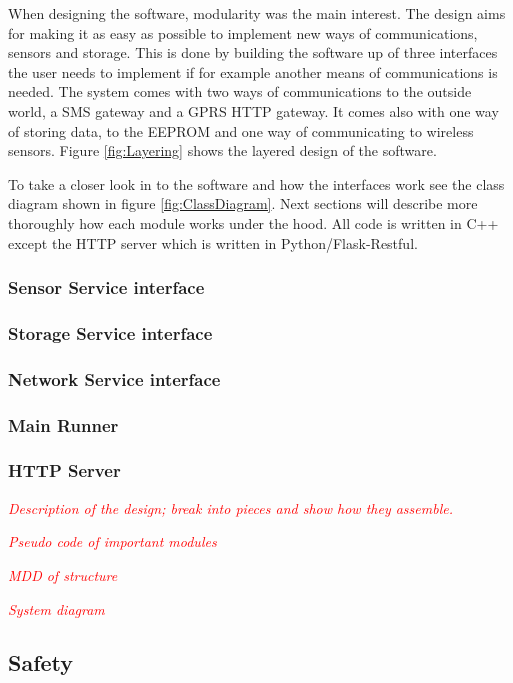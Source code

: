 When designing the software, modularity was the main interest. The design aims for making
it as easy as possible to implement new ways of communications, sensors and storage. This 
is done by building the software up of three interfaces the user needs to implement if for
example another means of communications is needed. The system comes with two ways of
communications to the outside world, a SMS gateway and a GPRS HTTP gateway. It comes also with one way of storing data, to the EEPROM and one way of communicating to wireless sensors. Figure \ref{fig:Layering} shows the layered design of the software. 

To take a closer look in to the software and how the interfaces work see the class diagram
shown in figure \ref{fig:ClassDiagram}. Next sections will describe more thoroughly how each 
module works under the hood. All code is written in C++ except the HTTP server which is 
written in Python/Flask-Restful.

\subsubsection{Sensor Service interface}

\subsubsection{Storage Service interface}

\subsubsection{Network Service interface}

\subsubsection{Main Runner}

\subsubsection{HTTP Server}

\textit{\textcolor{red}{Description of the design; break into pieces and show how 
						they assemble.}}

\textit{\textcolor{red}{Pseudo code of important modules}}

\textit{\textcolor{red}{MDD of structure}}

\textit{\textcolor{red}{System diagram}}

\subsection{Safety}
